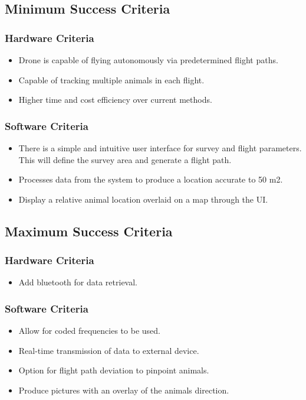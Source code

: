 \documentclass[onecolumn, draftclsnofoot,10pt, compsoc]{IEEEtran}
\begin{document}
    \subsection{Minimum Success Criteria}
        \subsubsection{Hardware Criteria}
            \begin{itemize}
                \item Drone is capable of flying    autonomously via predetermined flight paths.
                \item Capable of tracking multiple animals in each flight.
                \item Higher time and cost efficiency over current methods.
            \end{itemize}
        \subsubsection{Software Criteria}
            \begin{itemize}
                \item There is a simple and intuitive user interface for survey and flight parameters. This will define the survey area and generate a flight path.
                \item Processes data from the system to produce a location accurate to 50 m2.
                \item Display a relative animal location overlaid on a map through the UI.

            \end{itemize}
    \subsection{Maximum Success Criteria}
        \subsubsection{Hardware Criteria}
            \begin{itemize}
                \item Add bluetooth for data retrieval.
            \end{itemize}
        \subsubsection{Software Criteria}
            \begin{itemize}
                \item Allow for coded frequencies to be used.
                \item Real-time transmission of data to external device.
                \item Option for flight path deviation to pinpoint animals.
                \item Produce pictures with an overlay of the animals direction.
            \end{itemize}
\end{document}
